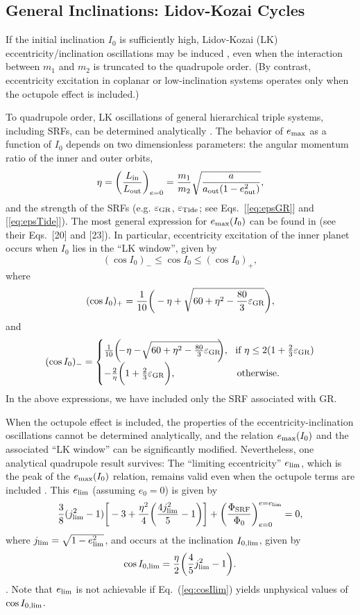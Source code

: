 \documentclass[12pt,useAMS, usenatbib]{mn2e}
\newcommand{\be}{\begin{equation}}
\newcommand{\ee}{\end{equation}}
\newcommand{\Max}{{\rm max}}
\newcommand{\In}{{\rm in}}
\newcommand{\Out}{{\rm out}}
\newcommand{\aout}{a_\Out}
\newcommand{\eout}{e_\Out}
\newcommand{\emax}{e_\Max}
\newcommand{\tide}{\rm Tide}
\newcommand{\gr}{\rm GR}
\begin{document}
\subsection{General Inclinations: Lidov-Kozai Cycles}
\label{sec:highinc}
If the initial inclination $I_0$ is sufficiently high, Lidov-Kozai (LK) eccentricity/inclination oscillations may be induced \citep{lidov1962,kozai1962}, even when the interaction between $m_1$ and $m_2$ is truncated to the quadrupole order. (By contrast, eccentricity excitation in coplanar or low-inclination systems operates only when the octupole effect is included.) 

To quadrupole order, LK oscillations of general hierarchical triple systems, including SRFs, can be determined analytically \citep{fabrycky2007, liu2015, kra2017}.  The behavior of $\emax$ as a function of $I_0$ depends on two dimensionless parameters: the angular momentum ratio of the inner and outer orbits,
\be
\eta = \bigg( \frac{L_\In}{L_\Out} \bigg)_{e = 0} = \frac{m_1}{m_2} \sqrt{\frac{a}{\aout (1 - \eout^2)}},
\ee
and the strength of the SRFs (e.g. $\varepsilon_{\gr}$, $\varepsilon_{\tide}$; see Eqs.~[\ref{eq:epsGR}] and [\ref{eq:epsTide}]). The most general expression for $\emax(I_0)$ can be found in \citealt{kra2017} (see their Eqs.~[20] and [23]).  In particular, eccentricity excitation of the inner planet occurs when $I_0$ lies in the ``LK window'', given by
\be
(\cos I_0)_- \leq \cos I_0 \leq (\cos I_0)_+, 
\label{eq:cos_range}
\ee
where
\be
(\cos I_0 )_{+} = \frac{1}{10} \bigg(-\eta + \sqrt{60 + \eta^2- \frac{80}{3} \varepsilon_{\gr} } \bigg),
\label{eq:I_plus}
\ee
and
\be
(\cos I_0 )_{-} = 
\begin{cases}
\frac{1}{10} \bigg(\! \! \! -\! \eta - \! \sqrt{60 + \eta^2- \frac{80}{3} \varepsilon_{\gr}} \! \! \bigg), &  \! \text{if } \eta \leq 2 (1 + \frac{2}{3} \varepsilon_{\gr} ) \\    
-\frac{2}{\eta} \bigg(1 + \frac{2}{3}\varepsilon_{\gr} \bigg), & \text{otherwise}. 
\label{eq:I_min}
\end{cases}
\ee
In the above expressions, we have included only the SRF associated with GR.

When the octupole effect is included, the properties of the eccentricity-inclination oscillations cannot be determined analytically, and the relation $\emax(I_0)$ and the associated ``LK window'' can be significantly modified. Nevertheless, one analytical quadrupole result survives: The ``limiting eccentricity'' $e_{\rm lim}$, which is the peak of the $\emax(I_0)$ relation, remains valid even when the octupole terms are included \citep{liu2015,kra2017}. This $e_{\rm lim}$ (assuming $e_0 = 0$) is given by 
\be
\frac{3}{8} (j_{\rm lim}^2 - 1) \bigg[-3 + \frac{\eta^2}{4} \bigg(\frac{4 j_{\rm lim}^2}{5} - 1 \bigg) \bigg] + \bigg(\frac{\Phi_{\rm SRF}}{\Phi_0} \bigg)_{e = 0}^{e = e_{\rm lim}} = 0,
\ee
where $j_{\rm lim} = \sqrt{1 - e_{\rm lim}^2}$, and occurs at the inclination $I_{0,\rm lim}$, given by 
\be
\cos I_{0,\rm lim} = \frac{\eta}{2} \bigg(\frac{4}{5} j_{\rm lim}^2 - 1 \bigg).
\label{eq:cosIlim}
\ee
\citep[see][]{kra2017}.  Note that $e_{\rm lim}$ is not achievable if Eq.~(\ref{eq:cosIlim}) yields unphysical values of $\cos I_{0,\rm lim}$.
\end{document}
